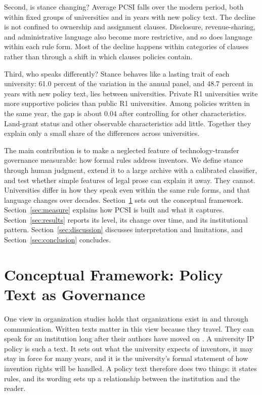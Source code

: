 \documentclass[11pt]{article}
\begin{document}
Second, is stance changing? Average PCSI falls over the modern period, both within fixed groups of universities and in years with new policy text. The decline is not confined to ownership and assignment clauses. Disclosure, revenue-sharing, and administrative language also become more restrictive, and so does language within each rule form. Most of the decline happens within categories of clauses rather than through a shift in which clauses policies contain.

Third, who speaks differently? Stance behaves like a lasting trait of each university: 61.0 percent of the variation in the annual panel, and 48.7 percent in years with new policy text, lies between universities. Private R1 universities write more supportive policies than public R1 universities. Among policies written in the same year, the gap is about 0.04 after controlling for other characteristics. Land-grant status and other observable characteristics add little. Together they explain only a small share of the differences across universities.

The main contribution is to make a neglected feature of technology-transfer governance measurable: how formal rules address inventors. We define stance through human judgment, extend it to a large archive with a calibrated classifier, and test whether simple features of legal prose can explain it away. They cannot. Universities differ in how they speak even within the same rule forms, and that language changes over decades. Section~\ref{sec:framework} sets out the conceptual framework. Section~\ref{sec:measure} explains how PCSI is built and what it captures. Section~\ref{sec:results} reports its level, its change over time, and its institutional pattern. Section~\ref{sec:discussion} discusses interpretation and limitations, and Section~\ref{sec:conclusion} concludes.

\section{Conceptual Framework: Policy Text as Governance}\label{sec:framework}

One view in organization studies holds that organizations exist in and through communication. Written texts matter in this view because they travel. They can speak for an institution long after their authors have moved on \citep{cooren2004textual,smith2001texts,putnam2004alternative,fairhurst2004organizations}. A university IP policy is such a text. It sets out what the university expects of inventors, it may stay in force for many years, and it is the university's formal statement of how invention rights will be handled. A policy text therefore does two things: it states rules, and its wording sets up a relationship between the institution and the reader.
\end{document}
